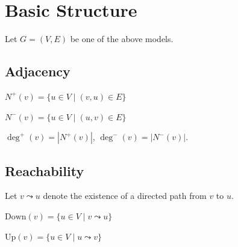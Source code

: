\section{Basic Structure}

Let $G = (V, E)$ be one of the above models.

\subsection{Adjacency}

\begin{definition}
$N^+(v) = \{u \in V \mid (v, u) \in E\}$
\end{definition}

\begin{definition}[In-neighbourhood]
$N^-(v) = \{u \in V \mid (u, v) \in E\}$
\end{definition}

\begin{definition}
$\deg^+(v) = |N^+(v)|$, \quad $\deg^-(v) = |N^-(v)|$.
\end{definition}

\subsection{Reachability}

Let $v \leadsto u$ denote the existence of a directed path from $v$ to $u$.

\begin{definition}
$\mathrm{Down}(v) = \{u \in V \mid v \leadsto u\}$
\end{definition}

\begin{definition}
$\mathrm{Up}(v) = \{u \in V \mid u \leadsto v\}$
\end{definition}
